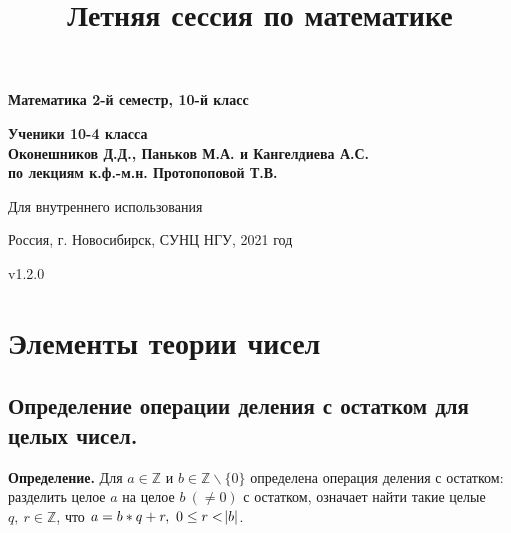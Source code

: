\documentclass{article}
\begin{document}
\title{Летняя сессия по математике}
    \begin{titlepage}
        \begin{center}
            \vspace*{1cm}
                
            \Huge
            \textbf{Математика 2-й семестр, 10-й класс}
                
            \vspace{5cm}
            
            \Large
            \textbf{Ученики 10-4 класса}\\
            \textbf{Оконешников Д.Д., Паньков М.А. и Кангелдиева А.С.}\\
            \textbf{по лекциям к.ф.-м.н. Протопоповой Т.В.}

            \vfill

            \vspace{0.8cm}

            \Large
            
            Для внутреннего использования
            
            Россия, г. Новосибирск, СУНЦ НГУ, 2021 год
            
            v1.2.0
                
        \end{center}
    \end{titlepage}
    \newpage
	
    \tableofcontents
	\thispagestyle{empty}
	\setcounter{tocdepth}{5}
	\newpage
    
    \section{Элементы теории чисел}
    	\subsection{Определение операции деления с остатком для целых чисел.}
    		\textbf{Определение.} Для \( a \in \mathbb{Z} \) и \( b \in \mathbb{Z} \backslash \{0\} \) определена операция деления с остатком: разделить целое \( a \) на целое \(b\ (\neq 0) \) с остатком, 
			означает найти такие целые \( q,\ r \in \mathbb{Z} \), что \(a=b*q+r,\ 0 \leq r < \abs{b} \).
            
\end{document}
